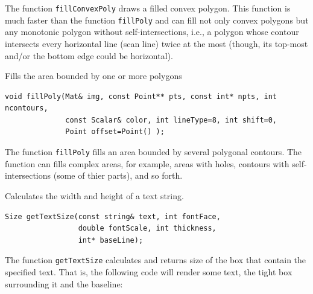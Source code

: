 The function \texttt{fillConvexPoly} draws a filled convex polygon.
This function is much faster than the function \texttt{fillPoly}
and can fill not only convex polygons but any monotonic polygon without self-intersections,
i.e., a polygon whose contour intersects every horizontal line (scan
line) twice at the most (though, its top-most and/or the bottom edge could be horizontal).

\label{fillPoly}
Fills the area bounded by one or more polygons

\begin{lstlisting}
void fillPoly(Mat& img, const Point** pts, const int* npts, int ncontours,
              const Scalar& color, int lineType=8, int shift=0,
              Point offset=Point() );
\end{lstlisting}
\begin{description}
\end{description}

The function \texttt{fillPoly} fills an area bounded by several
polygonal contours. The function can fills complex areas, for example,
areas with holes, contours with self-intersections (some of thier parts), and so forth.

\label{getTextSize}
Calculates the width and height of a text string.

\begin{lstlisting}
Size getTextSize(const string& text, int fontFace,
                 double fontScale, int thickness,
                 int* baseLine);
\end{lstlisting}
\begin{description}
\end{description}

The function \texttt{getTextSize} calculates and returns size of the box that contain the specified text.
That is, the following code will render some text, the tight box surrounding it and the baseline:

